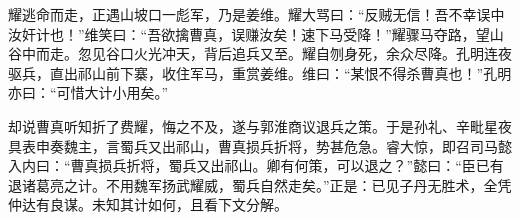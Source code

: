 耀逃命而走，正遇山坡口一彪军，乃是姜维。耀大骂曰：“反贼无信！吾不幸误中汝奸计也！”维笑曰：“吾欲擒曹真，误赚汝矣！速下马受降！”耀骤马夺路，望山谷中而走。忽见谷口火光冲天，背后追兵又至。耀自刎身死，余众尽降。孔明连夜驱兵，直出祁山前下寨，收住军马，重赏姜维。维曰：“某恨不得杀曹真也！”孔明亦曰：“可惜大计小用矣。”

却说曹真听知折了费耀，悔之不及，遂与郭淮商议退兵之策。于是孙礼、辛毗星夜具表申奏魏主，言蜀兵又出祁山，曹真损兵折将，势甚危急。睿大惊，即召司马懿入内曰：“曹真损兵折将，蜀兵又出祁山。卿有何策，可以退之？”懿曰：“臣已有退诸葛亮之计。不用魏军扬武耀威，蜀兵自然走矣。”正是：已见子丹无胜术，全凭仲达有良谋。未知其计如何，且看下文分解。